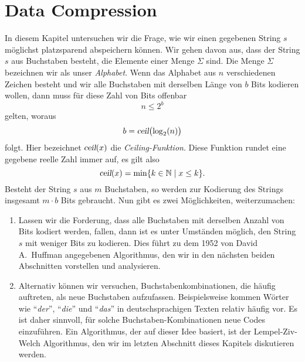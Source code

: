 \chapter{Data Compression}
In diesem Kapitel untersuchen wir die Frage, wie wir einen gegebenen String $s$ m\"oglichst platzsparend
abspeichern k\"onnen.  Wir gehen davon aus, dass der String $s$ aus Buchstaben besteht, die 
Elemente einer Menge $\Sigma$ sind.  Die Menge $\Sigma$ bezeichnen wir als unser \emph{Alphabet}. 
Wenn das Alphabet aus $n$ verschiedenen Zeichen besteht und wir alle Buchstaben mit derselben L\"ange
von $b$ Bits kodieren wollen, dann muss f\"ur diese Zahl von Bits offenbar
\[ n \leq 2^b \] 
gelten, woraus
\[ b = \textsl{ceil}\bigl(\log_2(n)\bigr) \]
folgt.  Hier bezeichnet $\textsl{ceil}(x)$ die \emph{Ceiling-Funktion}.  Diese Funktion
rundet eine gegebene reelle Zahl immer auf, es gilt also
\[ \textsl{ceil}(x) = \min \{ k \in {\mathbb N} \mid x \leq k \}. \]
Besteht der String $s$ aus $m$ Buchstaben, so werden zur Kodierung des Strings insgesamt
$m \cdot b$ Bits gebraucht.  Nun gibt es zwei M\"oglichkeiten, weiterzumachen:
\begin{enumerate}
\item Lassen wir die Forderung, dass alle Buchstaben mit derselben Anzahl von Bits kodiert werden,
      fallen, dann ist es unter Umst\"anden m\"oglich, den String $s$ mit weniger Bits zu kodieren.  
      Dies f\"uhrt zu dem 1952 von David A.~Huffman angegebenen Algorithmus, den wir in den n\"achsten
      beiden Abschnitten vorstellen und analysieren.
\item Alternativ k\"onnen wir versuchen, Buchstabenkombinationen, die h\"aufig auftreten, als neue
      Buchstaben aufzufassen.  Beispielsweise kommen W\"orter wie ``\emph{der}'', ``\emph{die}'' und
      ``\emph{das}'' in deutschsprachigen Texten relativ h\"aufig vor.  Es ist daher sinnvoll, f\"ur
      solche Buchstaben-Kombinationen neue Codes einzuf\"uhren.  Ein Algorithmus, der auf dieser Idee
      basiert, ist der Lempel-Ziv-Welch Algorithmus, den wir im letzten Abschnitt dieses Kapitels 
      diskutieren werden.
\end{enumerate}


